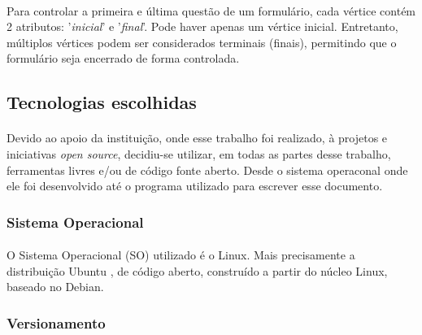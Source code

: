 \documentclass[11pt]{article}
\begin{document}
        \paragraph{}
        
        Para controlar a primeira e última questão de um formulário, cada
        vértice contém 2 atributos: '{\em inicial}' e '{\em final}'. Pode haver
        apenas um vértice inicial. Entretanto, múltiplos vértices podem ser
        considerados terminais (finais), permitindo que o formulário seja 
        encerrado de forma controlada.
        
      \subsection{Tecnologias escolhidas}
        
        \paragraph{}
        
        Devido ao apoio da instituição, onde esse trabalho foi realizado,
        à projetos e iniciativas {\em open source}, decidiu-se utilizar,
        em todas as partes desse trabalho, ferramentas livres e/ou de código fonte aberto.
        Desde o sistema operaconal onde ele foi desenvolvido até
        o programa utilizado para escrever esse documento.
        
        \subsubsection{Sistema Operacional}

          \paragraph{}
          
          O Sistema Operacional (SO) utilizado é o Linux. Mais 
          precisamente a distribuição Ubuntu \cite{website:ubuntu}, de código aberto, 
          construído a partir do núcleo Linux, baseado no Debian.
          
        \subsubsection{Versionamento}

          \paragraph{}
          
\end{document}
